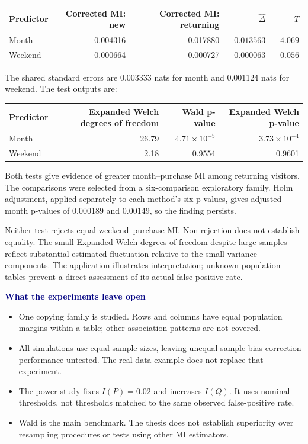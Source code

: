 \documentclass[11pt,a4paper]{article}
\newcommand{\Dh}{\widehat\Delta}
\newcommand{\subhead}[1]{\par\medskip\textbf{\textcolor{navy}{#1}}\par\smallskip}
\begin{document}
\begin{center}
\begin{tabular}{@{}lrrrr@{}}\toprule
Predictor & Corrected MI: new & Corrected MI: returning & \(\Dh\) & \(T\)\\\midrule
Month & 0.004316 & 0.017880 & $-0.013563$ & $-4.069$\\
Weekend & 0.000664 & 0.000727 & $-0.000063$ & $-0.056$\\\bottomrule
\end{tabular}
\end{center}
The shared standard errors are 0.003333 nats for month and 0.001124 nats for weekend. The test outputs are:
\begin{center}
\begin{tabular}{@{}lrrr@{}}\toprule
Predictor & Expanded Welch degrees of freedom & Wald p-value & Expanded Welch p-value\\\midrule
Month & 26.79 & $4.71\times10^{-5}$ & $3.73\times10^{-4}$\\
Weekend & 2.18 & 0.9554 & 0.9601\\\bottomrule
\end{tabular}
\end{center}
Both tests give evidence of greater month--purchase MI among returning visitors. The comparisons were selected from a six-comparison exploratory family. Holm adjustment, applied separately to each method's six p-values, gives adjusted month p-values of 0.000189 and 0.00149, so the finding persists.

Neither test rejects equal weekend--purchase MI. Non-rejection does not establish equality. The small Expanded Welch degrees of freedom despite large samples reflect substantial estimated fluctuation relative to the small variance components. The application illustrates interpretation; unknown population tables prevent a direct assessment of its actual false-positive rate.

\subhead{What the experiments leave open}
\begin{itemize}
\item One copying family is studied. Rows and columns have equal population margins within a table; other association patterns are not covered.
\item All simulations use equal sample sizes, leaving unequal-sample bias-correction performance untested. The real-data example does not replace that experiment.
\item The power study fixes \(I(P)=0.02\) and increases \(I(Q)\). It uses nominal thresholds, not thresholds matched to the same observed false-positive rate.
\item Wald is the main benchmark. The thesis does not establish superiority over resampling procedures or tests using other MI estimators.
\end{itemize}
\end{document}
